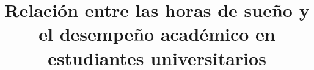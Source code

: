 \usepackage{lmodern}


\usepackage{textgreek}
\usepackage{amsmath}
\usepackage{amsthm, amssymb, amsfonts}
\usepackage{graphicx, color}
\usepackage{caption, subcaption}
\usepackage{multicol}
\usepackage{makeidx}
\makeindex
\usepackage{array, tabularx, multirow}

\usepackage{enumitem}

\usepackage{tikz-cd}
\usepackage{lipsum}


\usepackage{url}
\usepackage{fancyhdr}
\usepackage{titling}
\usepackage{datetime}

\graphicspath{ {img/} }

\pagestyle{fancy}
\fancyhf{}
\fancyhead[LO]{\nouppercase{\bfseries\rightmark}}
\renewcommand{\headrulewidth}{0.5pt}
\renewcommand{\footrulewidth}{0pt}
\addtolength{\headheight}{2pt}

\title{Relación entre las horas de sueño y el desempeño académico en estudiantes universitarios}



\makeatletter
  \def\cleardoublepage{\clearpage\if@twoside \ifodd\c@page\else
  \hbox{}
  \vspace*{\fill}
  \begin{center}
  \end{center}
  \vspace{\fill}
  \thispagestyle{empty}
  \newpage
  \if@twocolumn\hbox{}\newpage\fi\fi\fi}
\makeatother


\theoremstyle{plain}
\newtheorem{thm}[equation]{Theorem}
\newtheorem{lem}[equation]{Lemma}
\newtheorem{prop}[equation]{Proposition}
\newtheorem{coro}[equation]{Corollary}

\theoremstyle{definition}
\newtheorem{defn}[equation]{Definition}
\newtheorem{exam}[equation]{Example}
\newtheorem{prob}[equation]{Problem}

\theoremstyle{remark}
\newtheorem{note}[equation]{Note}
\newtheorem{rem}[equation]{Remark}

\newcommand{\cP}{\mathcal{P}}
\DeclareMathOperator{\aut}{Aut}
\newcommand{\scatter}{{scattering}}

\renewcommand{\labelitemi}{\tiny{$\blacksquare$}}
\renewcommand{\labelitemii}{$\cdot$}

\newcommand{\sm}{\setminus}
\renewcommand{\leq}{\leqslant}
\renewcommand{\geq}{\geqslant}
\renewcommand{\subset}{\subseteq}
\renewcommand{\qedsymbol}{$\blacksquare$}
\renewcommand{\epsilon}{\varepsilon}
\renewcommand{\bar}{\overline}

\usepackage[shadow, colorinlistoftodos,disable]{todonotes}

